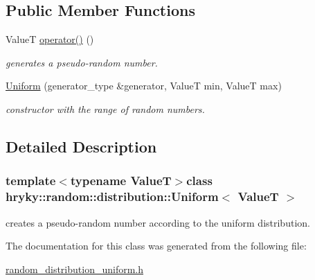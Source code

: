 \subsection*{Public Member Functions}
\begin{DoxyCompactItemize}
\item 
\hypertarget{classhryky_1_1random_1_1distribution_1_1_uniform_aa2748e4d5b6c9ac9881d58e0da0c181f}{Value\-T \hyperlink{classhryky_1_1random_1_1distribution_1_1_uniform_aa2748e4d5b6c9ac9881d58e0da0c181f}{operator()} ()}\label{classhryky_1_1random_1_1distribution_1_1_uniform_aa2748e4d5b6c9ac9881d58e0da0c181f}

\begin{DoxyCompactList}\small\item\em generates a pseudo-\/random number. \end{DoxyCompactList}\item 
\hypertarget{classhryky_1_1random_1_1distribution_1_1_uniform_a53d0304612f476e02199887d5fec290c}{\hyperlink{classhryky_1_1random_1_1distribution_1_1_uniform_a53d0304612f476e02199887d5fec290c}{Uniform} (generator\-\_\-type \&generator, Value\-T min, Value\-T max)}\label{classhryky_1_1random_1_1distribution_1_1_uniform_a53d0304612f476e02199887d5fec290c}

\begin{DoxyCompactList}\small\item\em constructor with the range of random numbers. \end{DoxyCompactList}\end{DoxyCompactItemize}


\subsection{Detailed Description}
\subsubsection*{template$<$typename Value\-T$>$class hryky\-::random\-::distribution\-::\-Uniform$<$ Value\-T $>$}

creates a pseudo-\/random number according to the uniform distribution. 

The documentation for this class was generated from the following file\-:\begin{DoxyCompactItemize}
\item 
\hyperlink{random__distribution__uniform_8h}{random\-\_\-distribution\-\_\-uniform.\-h}\end{DoxyCompactItemize}
